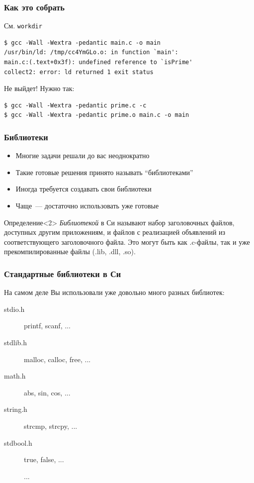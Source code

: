 \documentclass[aspectratio=169]{beamer}
\begin{document}
\begin{frame}[fragile]
    \frametitle{Как это собрать}

    См. \texttt{workdir}

    \begin{verbatim}
$ gcc -Wall -Wextra -pedantic main.c -o main
/usr/bin/ld: /tmp/cc4YmGLo.o: in function `main':
main.c:(.text+0x3f): undefined reference to `isPrime'
collect2: error: ld returned 1 exit status
    \end{verbatim}

    Не выйдет!
    Нужно так:
    \begin{verbatim}
$ gcc -Wall -Wextra -pedantic prime.c -c
$ gcc -Wall -Wextra -pedantic prime.o main.c -o main
    \end{verbatim}

\end{frame}

\begin{frame}
    \frametitle{Библиотеки}

    \begin{itemize}
        \item Многие задачи решали до вас неоднократно
        \item Такие готовые решения принято называть \enquote{библиотеками}
        \item Иногда требуется создавать свои библиотеки
        \item Чаще~--- достаточно использовать уже готовые
    \end{itemize}

    \begin{block}{Определение}<2>
        \textit{Библиотекой} в Си называют набор заголовочных файлов, доступных другим приложениям, и файлов с реализацией объявлений из соответствующего заголовочного файла.
        Это могут быть как .c-файлы, так и уже прекомпилированные файлы (.lib, .dll, .so).
    \end{block}

\end{frame}

\begin{frame}
    \frametitle{Стандартные библиотеки в Си}

    На самом деле Вы использовали уже довольно много разных библиотек:
    \begin{description}
        \item[stdio.h] printf, scanf, ...
        \item[stdlib.h] malloc, calloc, free, ...
        \item[math.h] abs, sin, cos, ...
        \item[string.h] strcmp, strcpy, ...
        \item[stdbool.h] true, false, ...
        \item[] ...
    \end{description}

\end{frame}
\end{document}

